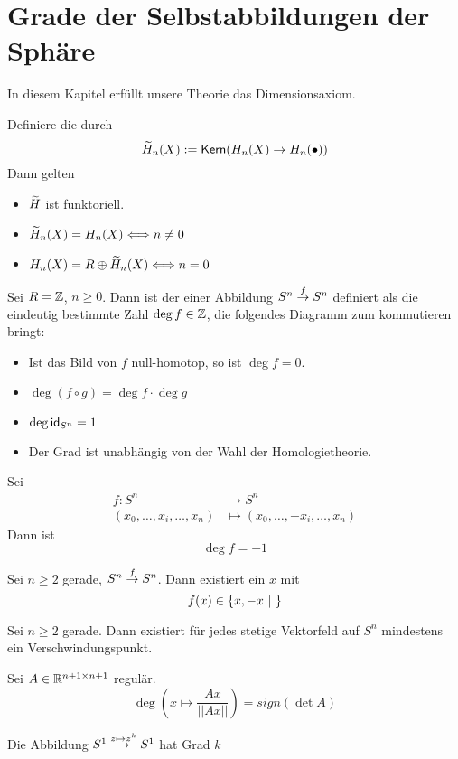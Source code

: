 \section{Grade der Selbstabbildungen der Sphäre}
In diesem Kapitel erfüllt unsere Theorie das Dimensionsaxiom.

Definiere die  durch
\[\widetilde{H}_n(X) := \textsf{Kern}(H_n(X) \overset{}{\rightarrow} H_n(\bullet)) \]
Dann gelten
\begin{itemize}
\item $\widetilde{H}$ ist funktoriell.
\item $\widetilde{H}_n(X) = H_n(X) \Longleftrightarrow  n \neq 0$ 
\item $H_n(X) = R\oplus \widetilde{H}_n(X) \Longleftrightarrow  n = 0$ 
\end{itemize}

Sei $R = \mathbb{Z}$, $n \geq 0$. Dann ist der  einer Abbildung $S^n\overset{f}{\rightarrow}S^n$ definiert als die eindeutig bestimmte Zahl $\deg f \in \mathbb{Z}$, die folgendes Diagramm zum kommutieren bringt:
\begin{center}
\end{center}

\Bem{}
\begin{itemize}
\item Ist das Bild von $f$ null-homotop, so ist $\deg f = 0$.
\item $\deg(f\circ g) = \deg f \cdot \deg g$
\item $\deg \textsf{id}_{S^n} = 1$
\item Der Grad ist unabhängig von der Wahl der Homologietheorie.
\end{itemize}

\Lem{}
Sei
\begin{align*}
f : S^n & \longrightarrow S^n\\
(x_0, \ldots, x_i, \ldots, x_n) & \longmapsto (x_0, \ldots, -x_i, \ldots, x_n)
\end{align*}
Dann ist
\[ \deg f = -1 \]

\Satz{}
Sei $n\geq 2$ gerade, $S^n \overset{f}{\rightarrow} S^n$. Dann existiert ein $x$ mit
\[f(x) \in \left\lbrace x, - x~|~ \right\rbrace \]

\Satz{}
Sei $n\geq 2$ gerade. Dann existiert für jedes stetige Vektorfeld auf $S^n$ mindestens ein Verschwindungspunkt.

\Satz{}
Sei $A \in \mathbb{R}^{n+1 \times n+1}$ regulär.
\[\deg (x\mapsto \frac{Ax}{||Ax||}) = sign(\det A) \]

\Satz{}
Die Abbildung $S^1\overset{z \mapsto z^k}{\rightarrow} S^1$ hat Grad $k$

